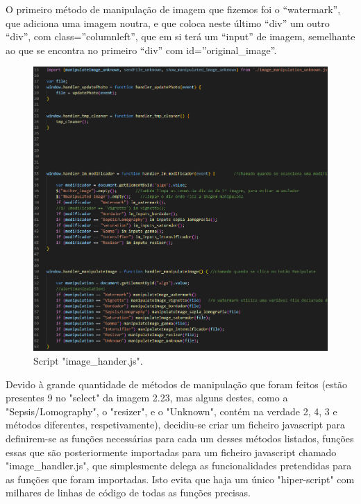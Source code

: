 \documentclass{report}
\begin{document}
\linebreak
 \bigskip
 
O primeiro método de manipulação de imagem que fizemos foi o “watermark”, que adiciona uma imagem noutra, e que coloca neste último “div” um outro “div”, com class=”columnleft”, que em si terá um “input” de imagem, semelhante ao que se encontra no primeiro “div” com id=”original\_image”.


 

 \begin{figure}[!hbtp]
        \centering
        \includegraphics[scale=0.52]{Images_code/12 - image manipulation js handler.png}
        \caption{\label{Estrutura}Script "image\_hander.js".}
\end{figure}


Devido à grande quantidade de métodos de manipulação que foram feitos (estão presentes 9 no "select" da imagem 2.23, mas alguns destes, como a "Sepsis/Lomography", o "resizer", e o "Unknown", contém na verdade 2, 4, 3 e métodos diferentes, respetivamente), decidiu-se criar um ficheiro javascript para definirem-se as funções necessárias para cada um desses métodos listados, funções essas que são posteriormente importadas para um ficheiro javascript chamado "image\_handler.js", que simplesmente delega as funcionalidades pretendidas para as funções que foram importadas. Isto evita que haja um único "hiper-script" com milhares de linhas de código de todas as funções precisas.
\end{document}
